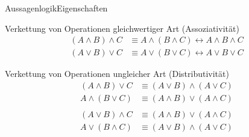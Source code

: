 \documentclass[xelatex,aspectratio=169]{beamer}
\begin{document}
\begin{frame}{Aussagenlogik}{Eigenschaften}
  \begin{block}{Verkettung von Operationen gleichwertiger Art (Assoziativität)}
    \vspace{-\baselineskip}
    \begin{align*}
      (A \land B) \land C & \equiv A \land (B \land C) \longleftrightarrow A \land B \land C \\
      (A \lor B) \lor C   & \equiv A \lor (B \lor C) \longleftrightarrow A \lor B \lor C
    \end{align*}
  \end{block}
  \begin{block}{Verkettung von Operationen ungleicher Art (Distributivität)}
    \vspace{-\baselineskip}
    \begin{align*}
      (A \land B) \lor C & \equiv (A \lor B) \land (A \lor C)  \\
      A \land (B \lor C) & \equiv (A \land B) \lor (A \land C) \\
      \\
      (A \lor B) \land C & \equiv (A \land B) \lor (A \land C) \\
      A \lor (B \land C) & \equiv (A \lor B) \land (A \lor C)
    \end{align*}
  \end{block}
\end{frame}
\end{document}
